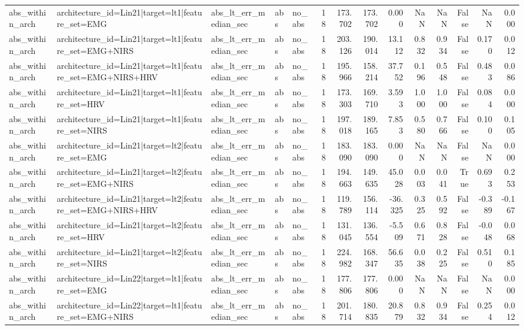 \begin{table}
\begin{tabular}{lllllrrrrrrrrr}
abs_within_arch & architecture_id=Lin21|target=lt1|feature_set=EMG & abs_lt_err_median_sec & abs & no_abs & 18 & 173.702 & 173.702 & 0.000 & NaN & NaN & False & NaN & 0.000 \\
abs_within_arch & architecture_id=Lin21|target=lt1|feature_set=EMG+NIRS & abs_lt_err_median_sec & abs & no_abs & 18 & 203.126 & 190.014 & 13.112 & 0.832 & 0.934 & False & 0.170 & 0.012 \\
abs_within_arch & architecture_id=Lin21|target=lt1|feature_set=EMG+NIRS+HRV & abs_lt_err_median_sec & abs & no_abs & 18 & 195.966 & 158.214 & 37.752 & 0.196 & 0.548 & False & 0.483 & 0.086 \\
abs_within_arch & architecture_id=Lin21|target=lt1|feature_set=HRV & abs_lt_err_median_sec & abs & no_abs & 18 & 173.303 & 169.710 & 3.593 & 1.000 & 1.000 & False & 0.084 & 0.000 \\
abs_within_arch & architecture_id=Lin21|target=lt1|feature_set=NIRS & abs_lt_err_median_sec & abs & no_abs & 18 & 197.018 & 189.165 & 7.853 & 0.580 & 0.766 & False & 0.100 & 0.105 \\
abs_within_arch & architecture_id=Lin21|target=lt2|feature_set=EMG & abs_lt_err_median_sec & abs & no_abs & 18 & 183.090 & 183.090 & 0.000 & NaN & NaN & False & NaN & 0.000 \\
abs_within_arch & architecture_id=Lin21|target=lt2|feature_set=EMG+NIRS & abs_lt_err_median_sec & abs & no_abs & 18 & 194.663 & 149.635 & 45.028 & 0.003 & 0.041 & True & 0.693 & 0.253 \\
abs_within_arch & architecture_id=Lin21|target=lt2|feature_set=EMG+NIRS+HRV & abs_lt_err_median_sec & abs & no_abs & 18 & 119.789 & 156.114 & -36.325 & 0.325 & 0.592 & False & -0.389 & -0.167 \\
abs_within_arch & architecture_id=Lin21|target=lt2|feature_set=HRV & abs_lt_err_median_sec & abs & no_abs & 18 & 131.045 & 136.554 & -5.509 & 0.671 & 0.828 & False & -0.048 & 0.068 \\
abs_within_arch & architecture_id=Lin21|target=lt2|feature_set=NIRS & abs_lt_err_median_sec & abs & no_abs & 18 & 224.982 & 168.347 & 56.635 & 0.038 & 0.225 & False & 0.510 & 0.185 \\
abs_within_arch & architecture_id=Lin22|target=lt1|feature_set=EMG & abs_lt_err_median_sec & abs & no_abs & 18 & 177.806 & 177.806 & 0.000 & NaN & NaN & False & NaN & 0.000 \\
abs_within_arch & architecture_id=Lin22|target=lt1|feature_set=EMG+NIRS & abs_lt_err_median_sec & abs & no_abs & 18 & 201.714 & 180.835 & 20.879 & 0.832 & 0.934 & False & 0.254 & 0.012 \\

\end{tabular}
\end{table}
